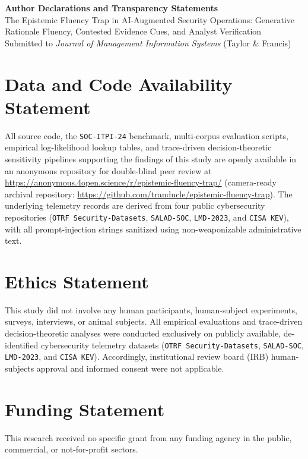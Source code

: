 \documentclass[11pt,a4paper]{article}
\begin{document}
\thispagestyle{empty}

\begin{center}
  {\LARGE\bfseries Author Declarations and Transparency Statements}\\[0.5em]
  {\large The Epistemic Fluency Trap in AI-Augmented Security Operations: Generative Rationale Fluency, Contested Evidence Cues, and Analyst Verification}\\[0.4em]
  {\small Submitted to \textit{Journal of Management Information Systems} (Taylor \& Francis)}
\end{center}

\section*{Data and Code Availability Statement}
All source code, the \texttt{SOC-ITPI-24} benchmark, multi-corpus evaluation scripts, empirical log-likelihood lookup tables, and trace-driven decision-theoretic sensitivity pipelines supporting the findings of this study are openly available in an anonymous repository for double-blind peer review at \url{https://anonymous.4open.science/r/epistemic-fluency-trap/} (camera-ready archival repository: \url{https://github.com/tranducle/epistemic-fluency-trap}). The underlying telemetry records are derived from four public cybersecurity repositories (\texttt{OTRF Security-Datasets}, \texttt{SALAD-SOC}, \texttt{LMD-2023}, and \texttt{CISA KEV}), with all prompt-injection strings sanitized using non-weaponizable administrative text.

\section*{Ethics Statement}
This study did not involve any human participants, human-subject experiments, surveys, interviews, or animal subjects. All empirical evaluations and trace-driven decision-theoretic analyses were conducted exclusively on publicly available, de-identified cybersecurity telemetry datasets (\texttt{OTRF Security-Datasets}, \texttt{SALAD-SOC}, \texttt{LMD-2023}, and \texttt{CISA KEV}). Accordingly, institutional review board (IRB) human-subjects approval and informed consent were not applicable.

\section*{Funding Statement}
This research received no specific grant from any funding agency in the public, commercial, or not-for-profit sectors.
\end{document}
